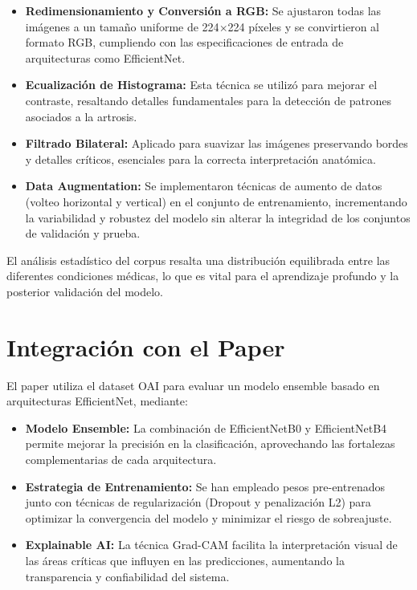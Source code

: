 \documentclass[11pt,spanish,listoffigures,listoftables]{tfgetsinf}
\begin{document}
\begin{itemize}
    \item \textbf{Redimensionamiento y Conversión a RGB:} Se ajustaron todas las imágenes a un tamaño uniforme de 224$\times$224 píxeles y se convirtieron al formato RGB, cumpliendo con las especificaciones de entrada de arquitecturas como EfficientNet.
    \item \textbf{Ecualización de Histograma:} Esta técnica se utilizó para mejorar el contraste, resaltando detalles fundamentales para la detección de patrones asociados a la artrosis.
    \item \textbf{Filtrado Bilateral:} Aplicado para suavizar las imágenes preservando bordes y detalles críticos, esenciales para la correcta interpretación anatómica.
    \item \textbf{Data Augmentation:} Se implementaron técnicas de aumento de datos (volteo horizontal y vertical) en el conjunto de entrenamiento, incrementando la variabilidad y robustez del modelo sin alterar la integridad de los conjuntos de validación y prueba.
\end{itemize}

El análisis estadístico del corpus resalta una distribución equilibrada entre las diferentes condiciones médicas, lo que es vital para el aprendizaje profundo y la posterior validación del modelo.

\section{Integración con el Paper}
El paper \cite{efficientnet_paper} utiliza el dataset OAI para evaluar un modelo ensemble basado en arquitecturas EfficientNet, mediante:

\begin{itemize}
    \item \textbf{Modelo Ensemble:} La combinación de EfficientNetB0 y EfficientNetB4 permite mejorar la precisión en la clasificación, aprovechando las fortalezas complementarias de cada arquitectura.
    \item \textbf{Estrategia de Entrenamiento:} Se han empleado pesos pre-entrenados junto con técnicas de regularización (Dropout y penalización L2) para optimizar la convergencia del modelo y minimizar el riesgo de sobreajuste.
    \item \textbf{Explainable AI:} La técnica Grad-CAM facilita la interpretación visual de las áreas críticas que influyen en las predicciones, aumentando la transparencia y confiabilidad del sistema.
\end{itemize}
\end{document}
